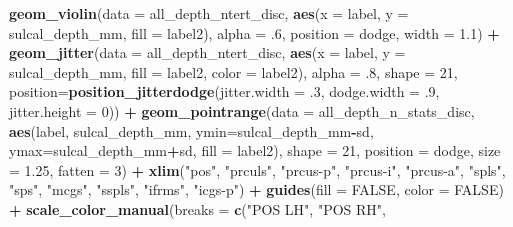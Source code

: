 \documentclass[
]{article}
\newenvironment{Shaded}{\begin{snugshade}}{\end{snugshade}}
\newcommand{\DataTypeTok}[1]{\textcolor[rgb]{0.13,0.29,0.53}{#1}}
\newcommand{\DecValTok}[1]{\textcolor[rgb]{0.00,0.00,0.81}{#1}}
\newcommand{\FloatTok}[1]{\textcolor[rgb]{0.00,0.00,0.81}{#1}}
\newcommand{\KeywordTok}[1]{\textcolor[rgb]{0.13,0.29,0.53}{\textbf{#1}}}
\newcommand{\NormalTok}[1]{#1}
\newcommand{\OperatorTok}[1]{\textcolor[rgb]{0.81,0.36,0.00}{\textbf{#1}}}
\newcommand{\OtherTok}[1]{\textcolor[rgb]{0.56,0.35,0.01}{#1}}
\newcommand{\StringTok}[1]{\textcolor[rgb]{0.31,0.60,0.02}{#1}}
\begin{document}
\begin{Shaded}
\begin{Highlighting}[]
\StringTok{  }\KeywordTok{geom_violin}\NormalTok{(}\DataTypeTok{data =}\NormalTok{ all_depth_ntert_disc, }\KeywordTok{aes}\NormalTok{(}\DataTypeTok{x =}\NormalTok{ label, }\DataTypeTok{y =}\NormalTok{ sulcal_depth_mm, }\DataTypeTok{fill =}\NormalTok{ label2), }
              \DataTypeTok{alpha =} \FloatTok{.6}\NormalTok{, }\DataTypeTok{position =}\NormalTok{ dodge, }\DataTypeTok{width =} \FloatTok{1.1}\NormalTok{) }\OperatorTok{+}\StringTok{ }
\StringTok{  }\KeywordTok{geom_jitter}\NormalTok{(}\DataTypeTok{data =}\NormalTok{ all_depth_ntert_disc, }\KeywordTok{aes}\NormalTok{(}\DataTypeTok{x =}\NormalTok{ label, }\DataTypeTok{y =}\NormalTok{ sulcal_depth_mm, }\DataTypeTok{fill =}\NormalTok{ label2, }\DataTypeTok{color =}\NormalTok{ label2), }
              \DataTypeTok{alpha =} \FloatTok{.8}\NormalTok{, }\DataTypeTok{shape =} \DecValTok{21}\NormalTok{,}
              \DataTypeTok{position=}\KeywordTok{position_jitterdodge}\NormalTok{(}\DataTypeTok{jitter.width =} \FloatTok{.3}\NormalTok{, }
                                            \DataTypeTok{dodge.width =} \FloatTok{.9}\NormalTok{, }
                                            \DataTypeTok{jitter.height =} \DecValTok{0}\NormalTok{)) }\OperatorTok{+}
\StringTok{  }\KeywordTok{geom_pointrange}\NormalTok{(}\DataTypeTok{data =}\NormalTok{ all_depth_n_stats_disc, }
                  \KeywordTok{aes}\NormalTok{(label, sulcal_depth_mm, }\DataTypeTok{ymin=}\NormalTok{sulcal_depth_mm}\OperatorTok{-}\NormalTok{sd, }\DataTypeTok{ymax=}\NormalTok{sulcal_depth_mm}\OperatorTok{+}\NormalTok{sd, }\DataTypeTok{fill =}\NormalTok{ label2), }
                  \DataTypeTok{shape =} \DecValTok{21}\NormalTok{, }\DataTypeTok{position =}\NormalTok{ dodge, }\DataTypeTok{size =} \FloatTok{1.25}\NormalTok{, }\DataTypeTok{fatten =} \DecValTok{3}\NormalTok{) }\OperatorTok{+}
\StringTok{  }\KeywordTok{xlim}\NormalTok{(}\StringTok{"pos"}\NormalTok{, }\StringTok{"prculs"}\NormalTok{, }\StringTok{"prcus-p"}\NormalTok{, }\StringTok{"prcus-i"}\NormalTok{, }\StringTok{"prcus-a"}\NormalTok{, }\StringTok{"spls"}\NormalTok{, }\StringTok{"sps"}\NormalTok{, }\StringTok{"mcgs"}\NormalTok{, }\StringTok{"sspls"}\NormalTok{, }\StringTok{"ifrms"}\NormalTok{, }\StringTok{"icgs-p"}\NormalTok{) }\OperatorTok{+}
\StringTok{  }\KeywordTok{guides}\NormalTok{(}\DataTypeTok{fill =} \OtherTok{FALSE}\NormalTok{, }\DataTypeTok{color =} \OtherTok{FALSE}\NormalTok{) }\OperatorTok{+}
\StringTok{  }\KeywordTok{scale_color_manual}\NormalTok{(}\DataTypeTok{breaks =} 
                       \KeywordTok{c}\NormalTok{(}\StringTok{"POS LH"}\NormalTok{, }\StringTok{"POS RH"}\NormalTok{,}

\end{Highlighting}
\end{Shaded}
\end{document}
